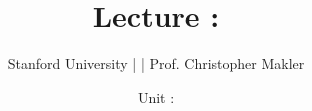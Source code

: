 \DeclareMathOperator{\Lagr}{\mathcal{L}}

\title{Lecture \lectureNumber: \topic{}}
\date{Unit \unitNumber{}: \unitTitle}
\author{Stanford University | \course{} | Prof. Christopher Makler}

\maketitle
